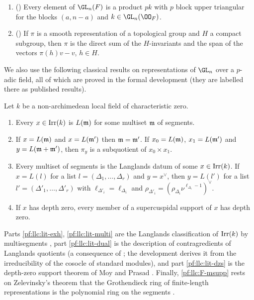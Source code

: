 \begin{enumerate}[label=(F\arabic*),leftmargin=3em]
  $U_a$ with $F$ in place of $\F_g$.
\item\label{pf:llc:F-iwasawa} ()
  Every element of $\GL_n(F)$ is a product $pk$ with $p$ block upper triangular for the blocks $(a,n-a)$ and
  $k\in\GL_n(\OO_F)$.
\item\label{pf:llc:F-compl} () If $\pi$ is a smooth
  representation of a topological group and $H$ a compact subgroup, then $\pi$ is the direct sum of the
  $H$-invariants and the span of the vectors $\pi(h)v-v$, $h\in H$.
\end{enumerate}

We also use the following classical results on representations of $\GL_n$ over a $p$-adic field, all of
which are proved in the formal development (they are labelled there as published results).

\begin{littheorem}\label{pf:llc:lit}
Let $k$ be a non-archimedean local field of characteristic zero.
\begin{enumerate}[label=(\alph*)]
\item\label{pf:llc:lit-exh} Every $x\in\operatorname{Irr}(k)$ is $L(\mathfrak m)$ for some multiset $\mathfrak m$ of segments.
\item\label{pf:llc:lit-multi} If $x=L(\mathfrak m)$ and $x=L(\mathfrak m')$ then $\mathfrak m=\mathfrak m'$. If $x_0=L(\mathfrak m)$, $x_1=L(\mathfrak m')$
  and $y=L(\mathfrak m+\mathfrak m')$, then $\pi_y$ is a subquotient of $x_0\times x_1$.
\item\label{pf:llc:lit-dual} Every multiset of segments is the Langlands datum of some $x\in\operatorname{Irr}(k)$. If
  $x=L(l)$ for a list $l=(\Delta_1,\dots,\Delta_r)$ and $y=x^\vee$, then $y=L(l')$ for a list
  $l'=(\Delta'_1,\dots,\Delta'_r)$ with $\ell_{\Delta'_i}=\ell_{\Delta_i}$ and
  $\rho_{\Delta'_i}=(\rho_{\Delta_i}\nu^{\ell_{\Delta_i}-1})^\vee$.
\item\label{pf:llc:lit-dzs} If $x$ has depth zero, every member of a supercuspidal support of $x$ has depth
  zero.
\end{enumerate}
\end{littheorem}

Parts \ref{pf:llc:lit-exh}, \ref{pf:llc:lit-multi} are the Langlands classification of $\operatorname{Irr}(k)$ by
multisegments \cite{Zelevinsky1980,Rodier1982}, part \ref{pf:llc:lit-dual} is the description of
contragredients of Langlands quotients (a consequence of
\cite{BernsteinZelevinsky1977,Zelevinsky1980}; the development derives it from the irreducibility of the
cosocle of standard modules), and part \ref{pf:llc:lit-dzs} is the depth-zero support theorem of Moy and
Prasad \cite{MoyPrasad1994,MoyPrasad1996}. Finally, \ref{pf:llc:F-msupp} rests on Zelevinsky's theorem
that the Grothendieck ring of finite-length representations is the polynomial ring on the segments
\cite{Zelevinsky1980}.

